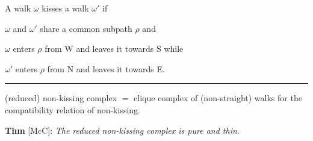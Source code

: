 \documentclass[portrait,final,a0paper,fontscale=0.25]{baposter}
\theoremstyle{definition}
\begin{document}
\begin{poster}
{\medskip

A walk $\omega$ {\color{green} kisses} a walk $\omega'$ if 
\begin{compactitem}
\item $\omega$ and $\omega'$ share a common subpath $\rho$ and
\item $\omega$ enters $\rho$ from W and leaves it towards S while
\item $\omega'$ enters $\rho$ from N and leaves it towards E.
\end{compactitem}

\vspace{-.15cm}
\hspace{-.25cm}
{\color{green} \rule{10.02cm}{1pt}}
\vspace{-.35cm}

{\color{green} (reduced) non-kissing complex} $=$ clique complex of (non-straight) walks for the compatibility relation of non-kissing.

\medskip
{\color{green} \bf Thm} [McC]: {\it The reduced non-kissing complex is pure and thin.}

}

\end{poster}
\end{document}
